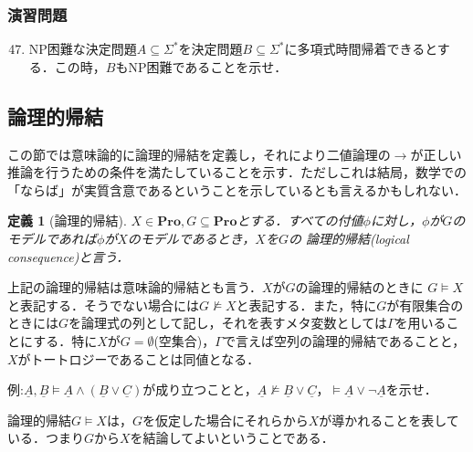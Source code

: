 \documentclass{ltjsarticle}
\theoremstyle{mystyle1}
\theoremstyle{mystyle3}
\theoremstyle{mystyle2}
\newtheorem{dfn*}{定義}
\newcommand{\uA}{\underline{A}}
\newcommand{\uB}{\underline{B}}
\newcommand{\uC}{\underline{C}}
\newcommand{\bPro}{\ensuremath{\mathbf{Pro}}}
\newcommand{\red}[1]{{\color{red} #1}}
\begin{document}
\subsubsection*{演習問題}
\begin{enumerate}
  \setcounter{enumi}{46}
  \item NP困難な決定問題$A\subseteq\Sigma^\ast$を決定問題$B\subseteq\Sigma^\ast$に多項式時間帰着できるとする．この時，$B$もNP困難であることを示せ．
\end{enumerate}
\subsection{論理的帰結}
この節では意味論的に論理的帰結を定義し，それにより二値論理の$\to$が正しい推論を行うための条件を満たしていることを示す．ただしこれは結局，数学での「ならば」が実質含意であるということを示しているとも言えるかもしれない．
\begin{dfn*}[論理的帰結]
$X\in\bPro,G\subseteq\bPro$とする．すべての付値$\phi$に対し，$\phi$が$G$のモデルであれば$\phi$が$X$のモデルであるとき，$X$を$G$の\red{論理的帰結}(logical consequence)と言う．
\end{dfn*}
上記の論理的帰結は意味論的帰結とも言う．$X$が$G$の論理的帰結のときに\red{$G\models X$}と表記する．そうでない場合には$G\not\models X$と表記する．また，特に$G$が有限集合のときには$G$を論理式の列として記し，それを表すメタ変数としては$\Gamma$を用いることにする．特に$X$が$G = \emptyset$(空集合)，$\Gamma$で言えば空列の論理的帰結であることと，$X$がトートロジーであることは同値となる．

例:$\uA,\uB\models\uA\wedge\left(\uB\vee\uC\right)$が成り立つことと，$\uA\not\models\uB\vee\uC，\models\uA\vee\neg\uA$を示せ．

論理的帰結$G\models X$は，$G$を仮定した場合にそれらから$X$が導かれることを表している．つまり$G$から$X$を結論してよいということである．
\end{document}
